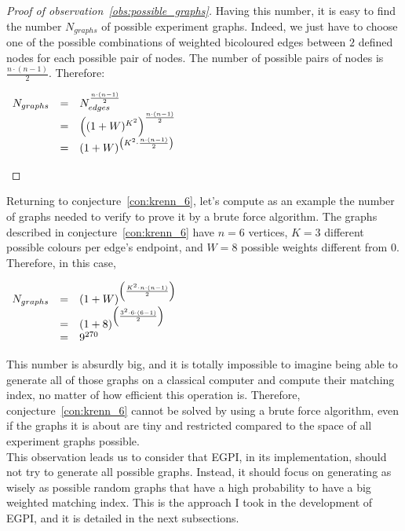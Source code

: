 \begin{proof}[Proof of observation~\ref{obs:possible_graphs}]
    Having this number, it is easy to find the number $N_{graphs}$ of possible experiment graphs.
    Indeed, we just have to choose one of the possible combinations of weighted bicoloured edges between $2$ defined nodes for each possible pair of nodes.
    The number of possible pairs of nodes is $\frac{n \cdot (n-1)}{2}$.
    Therefore:

    \begin{center}
        $\begin{array}{r c l}
             N_{graphs} & = & N_{edges} ^ {\frac{n \cdot (n-1)}{2}}                  \\
                        & = & \left((1 + W)^{K^2}\right)^{\frac{n \cdot (n-1)}{2}}   \\
                        & = & (1 + W)^{\left({K^2} \cdot \frac{n \cdot (n-1)}{2}\right)} \\
        \end{array}$
    \end{center}
\end{proof}

Returning to conjecture~\ref{con:krenn_6}, let's compute as an example the number of graphs needed to verify to prove it by a brute force algorithm.
The graphs described in conjecture~\ref{con:krenn_6} have $n = 6$ vertices, $K = 3$ different possible colours per edge's endpoint, and $W = 8$ possible weights different from $0$.
Therefore, in this case,

\begin{center}
    $\begin{array}{r c l}
         N_{graphs} & = & (1 + W)^{\left(\frac{K^2 \cdot n \cdot (n-1)}{2}\right)} \\
                    & = & (1 + 8)^{\left(\frac{3^2 \cdot 6 \cdot (6-1)}{2}\right)} \\
                    & = & 9^{270}
    \end{array}$
\end{center}

This number is absurdly big, and it is totally impossible to imagine being able to generate all of those graphs on a classical computer and compute their matching index, no matter of how efficient this operation is.
Therefore, conjecture~\ref{con:krenn_6} cannot be solved by using a brute force algorithm, even if the graphs it is about are tiny and restricted compared to the space of all experiment graphs possible.\\

This observation leads us to consider that EGPI, in its implementation, should not try to generate all possible graphs.
Instead, it should focus on generating as wisely as possible random graphs that have a high probability to have a big weighted matching index.
This is the approach I took in the development of EGPI, and it is detailed in the next subsections.


